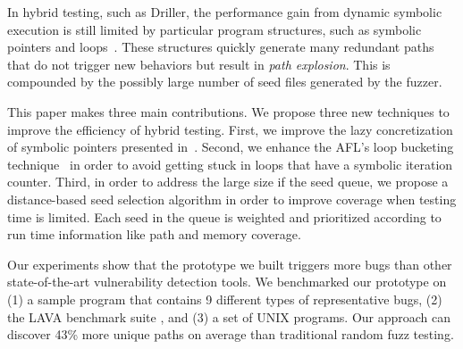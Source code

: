 In hybrid testing, such as Driller, the performance gain from dynamic
symbolic execution is still limited by particular program
structures, such as symbolic pointers and loops~\cite{schwartz2010all,
Boonstoppel:RAP, cadar2011symbolic, baldoni2016survey}. These structures
quickly generate many redundant paths that do not trigger new behaviors
but result in \textit{path explosion}. This is compounded by the possibly
large number of seed files generated by the fuzzer.


This paper makes three main contributions. We propose three new
techniques to improve the efficiency of hybrid testing. First, we
improve the lazy concretization of symbolic pointers presented
in~\cite{chipounov2011s2e}. Second, we enhance the AFL's loop bucketing
technique~\cite{online:afl} in order to avoid getting stuck in loops
that have a symbolic iteration counter. Third, in order to address the
large size if the seed queue, we propose a distance-based seed
selection algorithm in order to improve coverage when testing time is
limited. Each seed in the queue is weighted and prioritized according
to run time information like path and memory coverage.




Our experiments show that the prototype we built triggers more bugs
than other state-of-the-art vulnerability detection tools. We
benchmarked our prototype on (1) a sample program that contains 9
different types of representative bugs, (2) the LAVA benchmark suite
\cite{dolan2016lava}, and (3) a set of UNIX programs. Our approach can
discover 43\% more unique paths on average than traditional random fuzz
testing.

